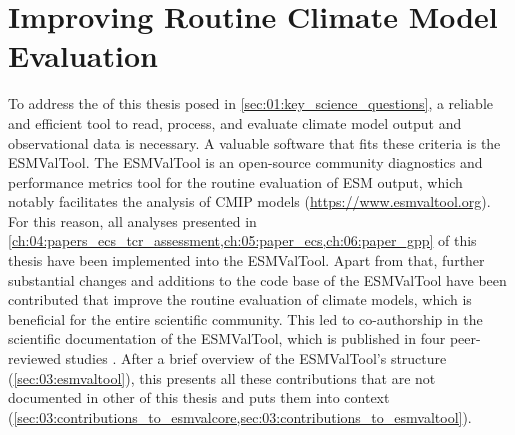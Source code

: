 
%



\chapter{Improving Routine Climate Model Evaluation}
\label{ch:03:esmvaltool}

To address the  of this thesis posed in
\cref{sec:01:key_science_questions}, a reliable and efficient tool to read,
process, and evaluate climate model output and observational data is necessary.
A valuable software that fits these criteria is the \ac{ESMValTool}. The
\ac{ESMValTool} is an open-source community diagnostics and performance metrics
tool for the routine evaluation of \ac{ESM} output, which notably facilitates
the analysis of \ac{CMIP} models (\url{https://www.esmvaltool.org}). For this
reason, all analyses presented in
\cref{ch:04:papers_ecs_tcr_assessment,ch:05:paper_ecs,ch:06:paper_gpp} of this
thesis have been implemented into the \ac{ESMValTool}. Apart from that, further
substantial changes and additions to the code base of the \ac{ESMValTool} have
been contributed that improve the routine evaluation of climate models, which
is beneficial for the entire scientific community. This led to co-authorship in
the scientific documentation of the \ac{ESMValTool}, which is published in four
peer-reviewed studies \autocite{Eyring2020, Lauer2020, Righi2020, Weigel2020}.
After a brief overview of the \ac{ESMValTool}'s structure
(\cref{sec:03:esmvaltool}), this  presents all these
contributions that are not documented in other
 of this thesis and puts them into
context
(\cref{sec:03:contributions_to_esmvalcore,sec:03:contributions_to_esmvaltool}).


